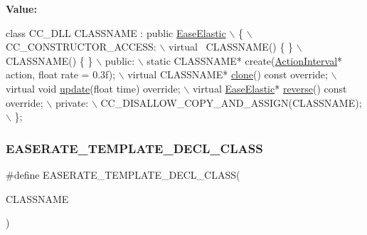 {\bfseries Value\+:}
\begin{DoxyCode}
\textcolor{keyword}{class }CC\_DLL CLASSNAME : \textcolor{keyword}{public} \hyperlink{classEaseElastic}{EaseElastic} \(\backslash\)
\{ \(\backslash\)
CC\_CONSTRUCTOR\_ACCESS: \(\backslash\)
    virtual ~CLASSNAME() \{ \} \(\backslash\)
    CLASSNAME() \{ \} \(\backslash\)
public: \(\backslash\)
    static CLASSNAME* create(\hyperlink{classActionInterval}{ActionInterval}* action, \textcolor{keywordtype}{float} rate = 0.3f); \(\backslash\)
    virtual CLASSNAME* \hyperlink{classEaseElastic_a72d5dc8a380dbb00e68c1d7c80258d28}{clone}() \textcolor{keyword}{const override}; \(\backslash\)
    virtual \textcolor{keywordtype}{void} \hyperlink{classActionEase_a77679f09c02cf75fb54776470c339fc5}{update}(\textcolor{keywordtype}{float} time) \textcolor{keyword}{override}; \(\backslash\)
    virtual \hyperlink{classEaseElastic}{EaseElastic}* \hyperlink{classEaseElastic_a9e0e8c55fbe1c50c706dd3d62834ed82}{reverse}() \textcolor{keyword}{const override}; \(\backslash\)
private: \(\backslash\)
    CC\_DISALLOW\_COPY\_AND\_ASSIGN(CLASSNAME); \(\backslash\)
\};
\end{DoxyCode}
\mbox{\label{group__actions_ga562d3d407d18aba175aa77b23501cb95}} 
\subsubsection{\texorpdfstring{E\+A\+S\+E\+R\+A\+T\+E\+\_\+\+T\+E\+M\+P\+L\+A\+T\+E\+\_\+\+D\+E\+C\+L\+\_\+\+C\+L\+A\+SS}{EASERATE\_TEMPLATE\_DECL\_CLASS}}
{\footnotesize\ttfamily \#define E\+A\+S\+E\+R\+A\+T\+E\+\_\+\+T\+E\+M\+P\+L\+A\+T\+E\+\_\+\+D\+E\+C\+L\+\_\+\+C\+L\+A\+SS(\begin{DoxyParamCaption}\item[{}]{C\+L\+A\+S\+S\+N\+A\+ME }\end{DoxyParamCaption})}

